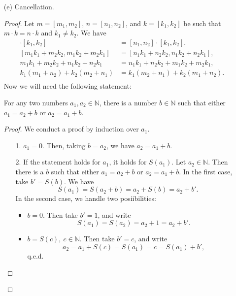 \begin{problem}
\begin{enumerate}
        \item[(e)] Cancellation.
            \begin{proof}
                Let $m = [m_1,m_2]$, $n = [n_1,n_2]$, and $k = [k_1,k_2]$ be such that $m \cdot k = n \cdot k$ and $k_1 \ne k_2$. We have
                \begin{align*}
                    [m_1,m_2] \cdot [k_1,k_2] &= [n_1,n_2] \cdot [k_1,k_2],\\
                    [m_1k_1+m_2k_2, m_1k_2+m_2k_1] &= [n_1k_1+n_2k_2, n_1k_2+n_2k_1],\\
                    m_1k_1 + m_2k_2 + n_1k_2 + n_2k_1 &= n_1k_1 + n_2k_2 + m_1k_2 + m_2k_1,\\
                    k_1(m_1+n_2) + k_2(m_2+n_1) &= k_1(m_2+n_1) + k_2(m_1+n_2).\\
                \end{align*}
                Now we will need the following statement:
                \begin{lemma*}
                    For any two numbers $a_1, a_2 \in \mathbb{N}$, there is a number $b \in \mathbb{N}$ such that either $a_1 = a_2 + b$ or $a_2 = a_1 + b$.
                \end{lemma*}
                \begin{proof}
                    We conduct a proof by induction over $a_1$.
                    \begin{enumerate}
                        \item[1.] $a_1 = 0$. Then, taking $b = a_2$, we have $a_2 = a_1 + b$.
                        \item[2.] If the statement holds for $a_1$, it holds for $S(a_1)$. Let $a_2 \in \mathbb{N}$. Then there is a $b$ such that either $a_1 = a_2 + b$ or $a_2 = a_1 + b$. In the first case, take $b' = S(b)$. We have
                        \[
                            S(a_1) = S(a_2 + b) = a_2 + S(b) = a_2 + b'.
                        \]
                        In the second case, we handle two posiibilities:
                            \begin{itemize}
                                \item $b = 0$. Then take $b' = 1$, and write 
                                \[
                                    S(a_1) = S(a_2) = a_2 + 1 = a_2 + b'.
                                \]
                            \item $b = S(c), \ c \in \mathbb{N}$. Then take $b' = c$, and write
                                \[
                                    a_2 = a_1 + S(c) = S(a_1) = c = S(a_1) + b',
                                \]
                                q.e.d.
                            \end{itemize}
                    \end{enumerate}
                \end{proof}


\end{proof}
\end{enumerate}
\end{problem}
